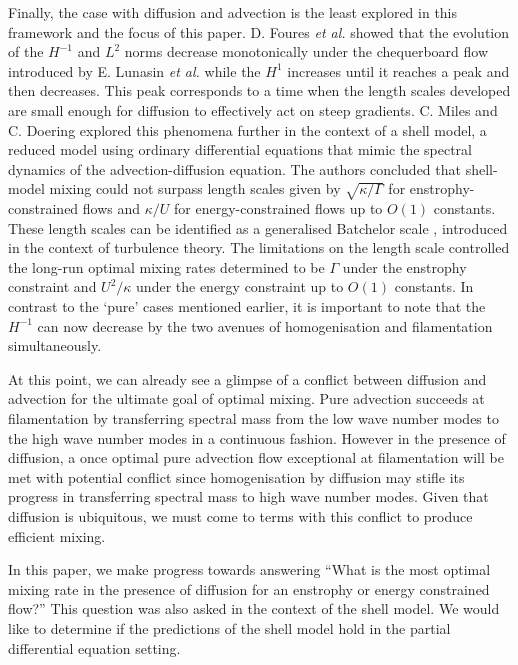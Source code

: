 \documentclass[12pt]{iopart}
\begin{document}
Finally, the case with diffusion and advection is the least explored in this framework and the focus of this paper. D. Foures {\it et al.} \cite{DF2014} showed that the evolution of the $H^{-1}$ and $L^2$ norms decrease monotonically under the chequerboard flow introduced by E. Lunasin {\it et al.} \cite{JMP2012} while the $H^{1}$ increases until it reaches a peak and then decreases. This peak corresponds to a  time when the length scales developed are small enough for diffusion to effectively act on steep gradients. C. Miles and C. Doering \cite{Miles2017a} explored this phenomena further in the context of a shell model, a reduced model using ordinary differential equations that mimic the spectral dynamics of the advection-diffusion equation. The authors concluded that shell-model mixing could not surpass length scales given by $\sqrt{\kappa/ \Gamma}$ for enstrophy-constrained flows and $\kappa/U$ for energy-constrained flows up to $O(1)$ constants. These length scales can be identified as a generalised Batchelor scale \cite{Batchelor1959a}, introduced in the context of turbulence theory. The limitations on the length scale controlled the long-run optimal mixing rates determined to be $\Gamma$ under the enstrophy constraint and $U^2/\kappa$ under the energy constraint up to $O(1)$ constants. In contrast to the `pure' cases mentioned earlier, it is important to note that the $H^{-1}$ can now decrease by the two avenues of homogenisation and filamentation simultaneously. 

At this point, we can already see a glimpse of a conflict between diffusion and advection for the ultimate goal of optimal mixing. Pure advection succeeds at filamentation by transferring spectral mass from the low wave number modes to the high wave number modes in a continuous fashion. However in the presence of diffusion, a once optimal pure advection flow exceptional at filamentation will be met with potential conflict since homogenisation by diffusion may stifle its progress in transferring spectral mass to high wave number modes. Given that diffusion is ubiquitous, we must come to terms with this conflict to produce efficient mixing.

In this paper, we make progress towards answering ``What is the most optimal mixing rate in the presence of diffusion for an enstrophy or energy constrained flow?'' This question was also asked in the context of the shell model. We would like to determine if the predictions of the shell model hold in the partial differential equation setting. 
\end{document}
